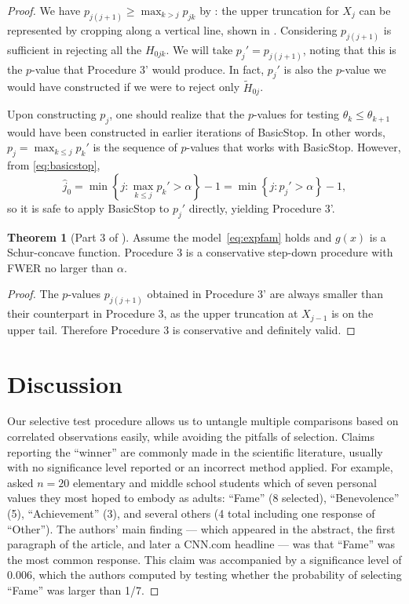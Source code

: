\documentclass[11pt]{article}
\theoremstyle{definition}
\theoremstyle{custom}
\newtheorem*{customthm}{Theorem}
\newcommand{\WFcomment}[1]{{\color{red}{(WF: \bf \sc #1) }}}
\begin{document}
\begin{proof}
We have $p_{j(j+1)} \ge \max_{k>j} p_{jk}$ by : the upper truncation for $X_j$ can be represented by cropping  along a vertical line, shown in . Considering $p_{j(j+1)}$ is sufficient in rejecting all the $H_{0jk}$. We will take $p_j' = p_{j(j+1)}$, noting that this is the $p$-value that Procedure 3' would produce. In fact, $p_j'$ is also the $p$-value we would have constructed if we were to reject only $\widetilde{H}_{0j}$.

Upon constructing $p_j$, one should realize that the $p$-values for testing $\theta_k \le \theta_{k+1}$ would have been constructed in earlier iterations of BasicStop. In other words, $p_j = \max_{k \le j} p_k'$ is the sequence of $p$-values that works with BasicStop. However, from \eqref{eq:basicstop},
$$\hat{j}_0 = \min\left\{j: \max_{k \le j} p_k' > \alpha\right\} - 1 = \min\left\{j: p_j' > \alpha\right\} - 1,$$
so it is safe to apply BasicStop to $p_j'$ directly, yielding Procedure 3'.

\begin{customthm}[Part 3 of ]
Assume the model~\eqref{eq:expfam} holds and $g\left(x\right)$ is a Schur-concave function. Procedure 3 is a conservative step-down procedure with FWER no larger than $\alpha$.
\end{customthm}

\begin{proof}
The $p$-values $p_{j\left(j+1\right)}$ obtained in Procedure 3' are always smaller than their counterpart in Procedure 3, as the upper truncation at $X_{j-1}$ is on the upper tail. Therefore Procedure 3 is conservative and definitely valid.
\end{proof}

\section{Discussion}
\label{sec:disc}

\WFcomment{Discussion still needs fleshing out.}

Our selective test procedure allows us to untangle multiple comparisons based on correlated observations easily, while avoiding the pitfalls of selection. Claims reporting the ``winner'' are commonly made in the scientific literature, usually with no significance level reported or an incorrect method applied. For example, \citet{Uhls:2012gf} asked $n=20$ elementary and middle school students which of seven personal values they most hoped to embody as adults: ``Fame'' (8 selected), ``Benevolence'' (5), ``Achievement'' (3), and several others (4 total including one response of ``Other''). The authors' main finding --- which appeared in the abstract, the first paragraph of the article, and later a CNN.com headline --- was that ``Fame'' was the most common response. This claim was accompanied by a significance level of $0.006$, which the authors computed by testing whether the probability of selecting ``Fame'' was larger than 1/7.


\end{proof}
\end{document}
